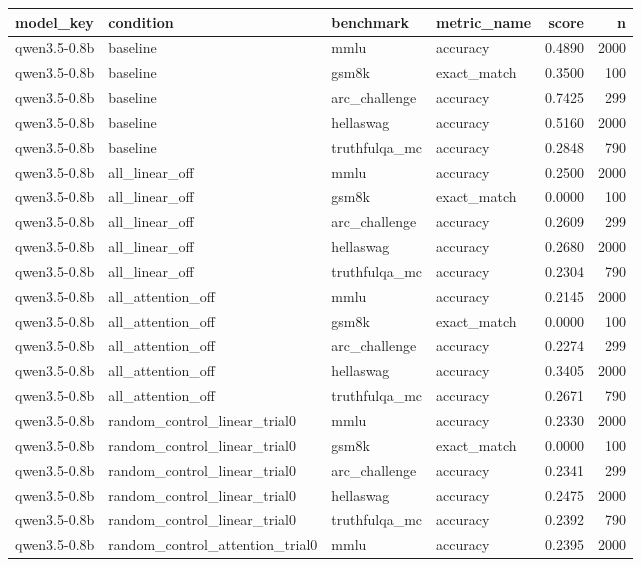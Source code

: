 \begin{tabular}{llllrr}
\toprule
model_key & condition & benchmark & metric_name & score & n \\
\midrule
qwen3.5-0.8b & baseline & mmlu & accuracy & 0.4890 & 2000 \\
qwen3.5-0.8b & baseline & gsm8k & exact_match & 0.3500 & 100 \\
qwen3.5-0.8b & baseline & arc_challenge & accuracy & 0.7425 & 299 \\
qwen3.5-0.8b & baseline & hellaswag & accuracy & 0.5160 & 2000 \\
qwen3.5-0.8b & baseline & truthfulqa_mc & accuracy & 0.2848 & 790 \\
qwen3.5-0.8b & all_linear_off & mmlu & accuracy & 0.2500 & 2000 \\
qwen3.5-0.8b & all_linear_off & gsm8k & exact_match & 0.0000 & 100 \\
qwen3.5-0.8b & all_linear_off & arc_challenge & accuracy & 0.2609 & 299 \\
qwen3.5-0.8b & all_linear_off & hellaswag & accuracy & 0.2680 & 2000 \\
qwen3.5-0.8b & all_linear_off & truthfulqa_mc & accuracy & 0.2304 & 790 \\
qwen3.5-0.8b & all_attention_off & mmlu & accuracy & 0.2145 & 2000 \\
qwen3.5-0.8b & all_attention_off & gsm8k & exact_match & 0.0000 & 100 \\
qwen3.5-0.8b & all_attention_off & arc_challenge & accuracy & 0.2274 & 299 \\
qwen3.5-0.8b & all_attention_off & hellaswag & accuracy & 0.3405 & 2000 \\
qwen3.5-0.8b & all_attention_off & truthfulqa_mc & accuracy & 0.2671 & 790 \\
qwen3.5-0.8b & random_control_linear_trial0 & mmlu & accuracy & 0.2330 & 2000 \\
qwen3.5-0.8b & random_control_linear_trial0 & gsm8k & exact_match & 0.0000 & 100 \\
qwen3.5-0.8b & random_control_linear_trial0 & arc_challenge & accuracy & 0.2341 & 299 \\
qwen3.5-0.8b & random_control_linear_trial0 & hellaswag & accuracy & 0.2475 & 2000 \\
qwen3.5-0.8b & random_control_linear_trial0 & truthfulqa_mc & accuracy & 0.2392 & 790 \\
qwen3.5-0.8b & random_control_attention_trial0 & mmlu & accuracy & 0.2395 & 2000 \\

\end{tabular}
